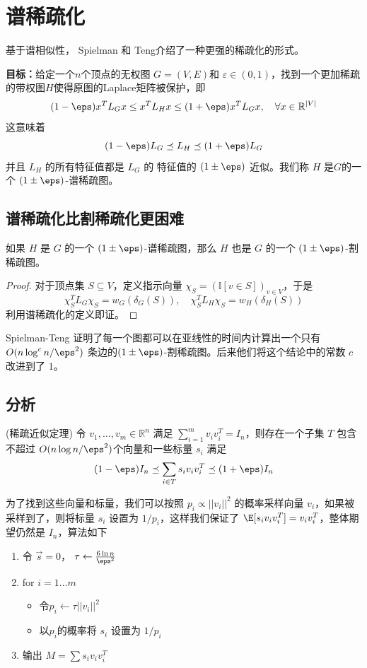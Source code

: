 \section{谱稀疏化}
基于谱相似性， Spielman 和 Teng介绍了一种更强的稀疏化的形式。

\textbf{目标：}给定一个$n$个顶点的无权图 $G=(V,E)$和 $\varepsilon\in(0,1)$，找到一个更加稀疏的带权图$H$使得原图的Laplace矩阵被保护，即
\[
(1-\eps) x^TL_G x\leq x^TL_H x\leq (1+\eps) x^TL_G x, \quad \forall x\in \mathbb{R}^{|V|}
\]
这意味着
\[
(1-\eps) L_G \preceq L_H \preceq (1+\eps) L_G
\]
并且 $L_H$ 的所有特征值都是 $L_G$ 的 特征值的 $(1\pm\eps)$ 近似。我们称 $H$ 是$G$的一个 $(1\pm\eps)$-谱稀疏图。

\subsection{谱稀疏化比割稀疏化更困难}
\begin{lemma}
    如果 $H$ 是 $G$ 的一个 $(1\pm\eps)$-谱稀疏图，那么 $H$ 也是 $G$ 的一个 $(1\pm\eps)$-割稀疏图。
\end{lemma}
\begin{proof}
    对于顶点集 $S\subseteq V$，定义指示向量 $\chi_S=(\mathbb{I}[v\in S])_{v\in V}$，于是
    \[
    \chi_S^TL_G \chi_S=w_G(\delta_G(S)),\quad 
    \chi_S^TL_H \chi_S=w_H(\delta_H(S))
    \]
    利用谱稀疏化的定义即证。
\end{proof}

Spielman-Teng 证明了每一个图都可以在亚线性的时间内计算出一个只有 $O(n\log^cn/\eps^2)$ 条边的$(1\pm\eps)$-割稀疏图。后来他们将这个结论中的常数 $c$ 改进到了 $1$。

\subsection{分析}
\begin{theorem}{(稀疏近似定理)}
\label{thm:sparse-approx}
    令 $v_1,\dots, v_m\in\mathbb{R}^n$ 满足 $\sum_{i=1}^m v_i v_i^T = I_n$，则存在一个子集 $T$ 包含不超过 $O(n\log n/\eps^2)$个向量和一些标量 $s_i$ 满足
    \[
    (1-\eps)I_n\preceq \sum_{i\in T} s_iv_iv_i^T\preceq (1+\eps)I_n
    \]
\end{theorem}

为了找到这些向量和标量，我们可以按照 $p_i\propto||v_i||^2$ 的概率采样向量 $v_i$，如果被采样到了，则将标量 $s_i$ 设置为 $1/p_i$，这样我们保证了 $\E[s_iv_iv_i^T]=v_iv_i^T$，整体期望仍然是 $I_n$，算法如下
\begin{enumerate}
    \item 令 $\vec{s}=0$， $\tau \gets \frac{6\ln n}{\eps^2}$
    \item for $i=1\dots m$
        \begin{itemize}
            \item 令$p_i\gets \tau ||v_i||^2$
            \item 以$p_i$的概率将 $s_i$ 设置为 $1/p_i$
        \end{itemize}
    \item 输出 $M=\sum s_iv_iv_i^T$
\end{enumerate}

